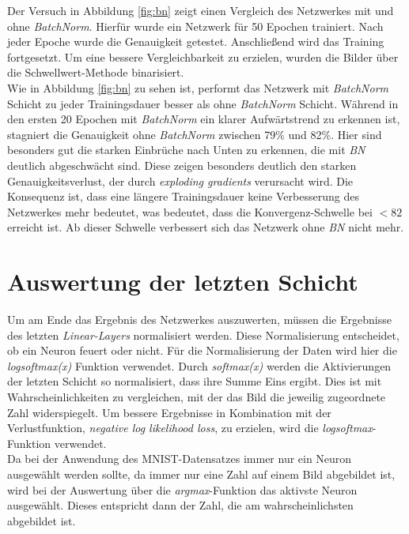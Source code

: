Der Versuch in Abbildung \ref{fig:bn} zeigt einen Vergleich des Netzwerkes mit und ohne \textit{BatchNorm}. Hierfür wurde ein Netzwerk für 50 Epochen trainiert. Nach jeder Epoche wurde die Genauigkeit getestet. Anschließend wird das Training fortgesetzt. Um eine bessere Vergleichbarkeit zu erzielen, wurden die Bilder über die Schwellwert-Methode binarisiert.\\

Wie in Abbildung \ref{fig:bn} zu sehen ist, performt das Netzwerk mit \textit{BatchNorm} Schicht zu jeder Trainingsdauer besser als ohne \textit{BatchNorm} Schicht. Während in den ersten 20 Epochen mit \textit{BatchNorm} ein klarer Aufwärtstrend zu erkennen ist, stagniert die Genauigkeit ohne \textit{BatchNorm} zwischen 79\% und 82\%. Hier sind besonders gut die starken Einbrüche nach Unten zu erkennen, die mit \textit{BN} deutlich abgeschwächt sind. Diese zeigen besonders deutlich den starken Genauigkeitsverlust, der durch \textit{exploding gradients} verursacht wird. Die Konsequenz ist, dass eine längere Trainingsdauer keine Verbesserung des Netzwerkes mehr bedeutet, was bedeutet, dass die Konvergenz-Schwelle bei $< 82$ erreicht ist. Ab dieser Schwelle verbessert sich das Netzwerk ohne \textit{BN} nicht mehr.


\section{Auswertung der letzten Schicht}
Um am Ende das Ergebnis des Netzwerkes auszuwerten, müssen die Ergebnisse des letzten \textit{Linear-Layers} normalisiert werden. Diese Normalisierung entscheidet, ob ein Neuron feuert oder nicht. Für die Normalisierung der Daten wird hier die \textit{logsoftmax(x)} Funktion verwendet. Durch \textit{softmax(x)} werden die Aktivierungen der letzten Schicht so normalisiert, dass ihre Summe Eins ergibt. Dies ist mit Wahrscheinlichkeiten zu vergleichen, mit der das Bild die jeweilig zugeordnete Zahl widerspiegelt. Um bessere Ergebnisse in Kombination mit der Verlustfunktion, \textit{negative log likelihood loss}, zu erzielen, wird die \textit{logsoftmax}-Funktion verwendet.\\
Da bei der Anwendung des MNIST-Datensatzes immer nur ein Neuron ausgewählt werden sollte, da immer nur eine Zahl auf einem Bild abgebildet ist, wird bei der Auswertung über die \textit{argmax}-Funktion das aktivste Neuron ausgewählt. Dieses entspricht dann der Zahl, die am wahrscheinlichsten abgebildet ist.


